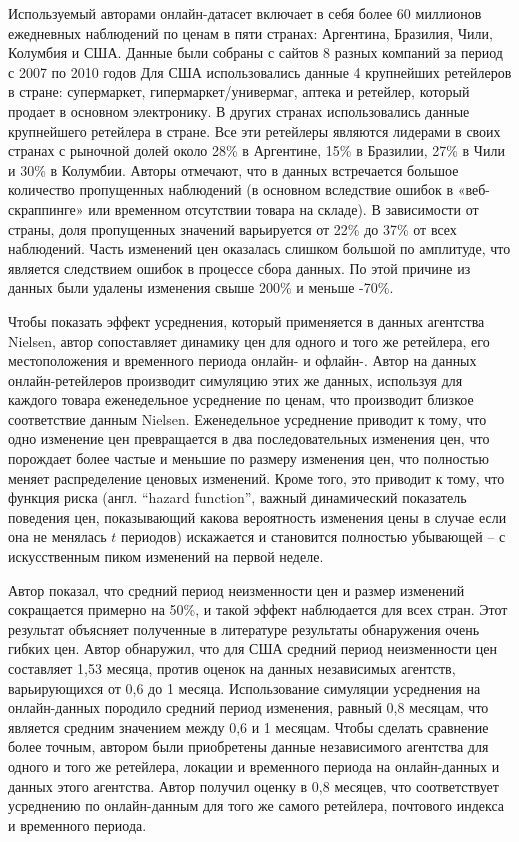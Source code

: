 Используемый авторами онлайн-датасет включает в себя более 60 миллионов ежедневных наблюдений по ценам в пяти странах: Аргентина, Бразилия, Чили, Колумбия и США. Данные были собраны с сайтов 8 разных компаний за период с 2007 по 2010 годов Для США использовались данные 4 крупнейших ретейлеров в стране: супермаркет, гипермаркет/универмаг, аптека и ретейлер, который продает в основном электронику. В других странах использовались данные крупнейшего ретейлера в стране. Все эти ретейлеры являются лидерами в своих странах с рыночной долей около 28\% в Аргентине, 15\% в Бразилии, 27\% в Чили и 30\% в Колумбии. Авторы отмечают, что в данных встречается большое количество пропущенных наблюдений (в основном вследствие ошибок в «веб-скраппинге» или временном отсутствии товара на складе). В зависимости от страны, доля пропущенных значений варьируется от 22\% до 37\% от всех наблюдений. Часть изменений цен оказалась слишком большой по амплитуде, что является следствием ошибок в процессе сбора данных. По этой причине из данных были удалены изменения свыше 200\% и меньше -70\%.

Чтобы показать эффект усреднения, который применяется в данных агентства Nielsen, автор сопоставляет динамику цен для одного и того же ретейлера, его местоположения и временного периода онлайн- и офлайн-. Автор на данных онлайн-ретейлеров производит симуляцию этих же данных, используя для каждого товара еженедельное усреднение по ценам, что производит близкое соответствие данным Nielsen. Еженедельное усреднение приводит к тому, что одно изменение цен превращается в два последовательных изменения цен, что порождает более частые и меньшие по размеру изменения цен, что полностью меняет распределение ценовых изменений. Кроме того, это приводит к тому, что функция риска (англ. ``hazard function'', важный динамический показатель поведения цен, показывающий какова вероятность изменения цены в случае если она не менялась $t$ периодов) искажается и становится полностью убывающей – с искусственным пиком изменений на первой неделе.

Автор показал, что средний период неизменности цен и размер изменений сокращается примерно на 50\%, и такой эффект наблюдается для всех стран. Этот результат объясняет полученные в литературе результаты обнаружения очень гибких цен. Автор обнаружил, что для США средний период неизменности цен составляет 1,53 месяца, против оценок на данных независимых агентств, варьирующихся от 0,6 до 1 месяца. Использование симуляции усреднения на онлайн-данных породило средний период изменения, равный 0,8 месяцам, что является средним значением между 0,6 и 1 месяцам. Чтобы сделать сравнение более точным, автором были приобретены данные независимого агентства для одного и того же ретейлера, локации и временного периода на онлайн-данных и данных этого агентства. Автор получил оценку в 0,8 месяцев, что соответствует усреднению по онлайн-данным для того же самого ретейлера, почтового индекса и временного периода.

